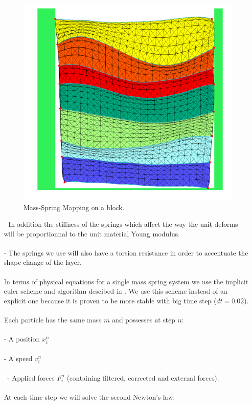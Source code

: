 \documentclass[12pt, a4paper]{memoir} %
\begin{document}
	\begin{figure}[H]
	\centering
	\includegraphics[scale=0.5]{springMapping.png}
	\caption{Mass-Spring Mapping on a block.}
	\end{figure}
	
	\indent	- In addition the stiffness of the springs which affect the way the unit deforms will be proportionnal to the unit material Young modulus. \\\\
\indent	- The springs we use will also have a torsion resistance in order to accentuate the shape change of the layer.\\\\
In terms of physical equations for a single mass spring system we use the implicit euler scheme and algorithm descibed in \cite{caltech}. We use this scheme instead of an explicit one because it is proven to be more stable with big time step ($dt = 0.02$).\\\\ 
Each particle has the same mass $m$ and possesses at step $n$:\\\\
\indent	- A position  $x_i^n$\\\\
\indent	- A speed $v_i^n$ \\\\\
\indent	- Applied forces $F_i^n$ (containing filtered, corrected and external forces).\\\\
At each time step we will solve the second Newton's law:\\
\end{document}

